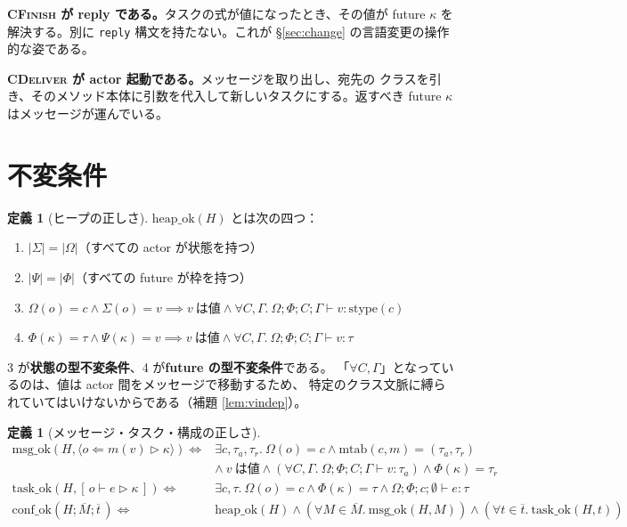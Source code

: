 \documentclass[11pt,a4paper]{ltjsarticle}
\theoremstyle{definition}
\newtheorem{definition}[theorem]{定義}
\theoremstyle{remark}
\newcommand{\Om}{\Omega}          %
\newcommand{\Sm}{\Sigma}          %
\newcommand{\Ph}{\Phi}            %
\newcommand{\Ps}{\Psi}            %
\newcommand{\jt}[3]{\Om;\Ph;#1;#2 \vdash #3}
\newcommand{\mtab}{\mathrm{mtab}}
\newcommand{\stype}{\mathrm{stype}}
\newcommand{\heapok}{\mathrm{heap\_ok}}
\newcommand{\msgok}{\mathrm{msg\_ok}}
\newcommand{\taskok}{\mathrm{task\_ok}}
\newcommand{\confok}{\mathrm{conf\_ok}}
\begin{document}
\textbf{\textsc{CFinish} が reply である。}タスクの式が値になったとき、その値が
future $\kappa$ を解決する。別に \verb|reply| 構文を持たない。これが
\S\ref{sec:change} の言語変更の操作的な姿である。

\textbf{\textsc{CDeliver} が actor 起動である。}メッセージを取り出し、宛先の
クラスを引き、そのメソッド本体に引数を代入して新しいタスクにする。返すべき
future $\kappa$ はメッセージが運んでいる。

\section{不変条件}

\begin{definition}[ヒープの正しさ]
$\heapok(H)$ とは次の四つ：
\begin{enumerate}
\item $|\Sm| = |\Om|$（すべての actor が状態を持つ）
\item $|\Ps| = |\Ph|$（すべての future が枠を持つ）
\item $\Om(o) = c \land \Sm(o) = v \implies
      v\ \text{は値} \land \forall C, \Gamma.\ \jt{C}{\Gamma}{v : \stype(c)}$
\item $\Ph(\kappa) = \tau \land \Ps(\kappa) = v \implies
      v\ \text{は値} \land \forall C, \Gamma.\ \jt{C}{\Gamma}{v : \tau}$
\end{enumerate}
\end{definition}

3 が\textbf{状態の型不変条件}、4 が\textbf{future の型不変条件}である。
「$\forall C, \Gamma$」となっているのは、値は actor 間をメッセージで移動するため、
特定のクラス文脈に縛られていてはいけないからである（補題 \ref{lem:vindep}）。

\begin{definition}[メッセージ・タスク・構成の正しさ]
\begin{align*}
\msgok(H, \langle o \Leftarrow m(v) \rhd \kappa\rangle) \iff
  &\exists c, \tau_a, \tau_r.\
   \Om(o) = c \land \mtab(c,m) = (\tau_a,\tau_r)\\
  &\land\ v\ \text{は値}
   \land (\forall C,\Gamma.\ \jt{C}{\Gamma}{v : \tau_a})
   \land \Ph(\kappa) = \tau_r\\[2mm]
\taskok(H, [\,o \vdash e \rhd \kappa\,]) \iff
  &\exists c, \tau.\
   \Om(o) = c \land \Ph(\kappa) = \tau \land \jt{c}{\emptyset}{e : \tau}\\[2mm]
\confok(H; \overline{M}; \overline{t}\,) \iff
  &\heapok(H)
   \land (\forall M \in \overline{M}.\ \msgok(H,M))
   \land (\forall t \in \overline{t}.\ \taskok(H,t))
\end{align*}
\end{definition}
\end{document}
